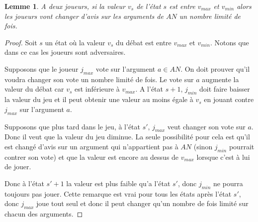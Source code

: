 \documentclass[12pt]{article}
\newtheorem{lemme}{Lemme}[section]
\theoremstyle{defi}
\theoremstyle{not}
\theoremstyle{prob}
\begin{document}
      \begin{lemme}
        \label{lem:question_5}
        A deux joueurs, si la valeur $v_s$ de l'état $s$ est entre $v_{max}$ et $v_{min}$ alors les joueurs vont changer d'avis sur les arguments de $AN$ un nombre limité de fois.
      \end{lemme}
      \begin{proof}
        Soit $s$ un état où la valeur $v_s$ du débat est entre $v_{max}$ et $v_{min}$. Notons que dans ce cas les joueurs sont adversaires.

        Supposons que le joueur $j_{max}$ vote sur l'argument $a \in AN$. On doit prouver qu'il voudra changer son vote un nombre limité de fois.
        Le vote sur $a$ augmente la valeur du débat car $v_s$ est inférieure à $v_{max}$. A l'état $s+1$, $j_{min}$ doit faire baisser la valeur du jeu et il peut obtenir une valeur au moins égale à $v_s$ en jouant contre $j_{max}$ sur l'argument $a$.

        Supposons que plus tard dans le jeu, à l'état $s'$, $j_{max}$ veut changer son vote sur $a$. Donc il veut que la valeur du jeu diminue. La seule possibilité pour cela est qu'il est changé d'avis sur un argument qui n'appartient pas à $AN$ (sinon $j_{min}$ pourrait contrer son vote) et que la valeur est encore au dessus de $v_{max}$ lorsque c'est à lui de jouer.

        Donc à l'état $s'+1$ la valeur est plus faible qu'a l'état $s'$, donc $j_{min}$ ne pourra toujours pas jouer. Cette remarque est vrai pour tous les états après l'état $s'$, donc $j_{max}$ joue tout seul et donc il peut changer qu'un nombre de fois limité sur chacun des arguments.
      \end{proof}
\end{document}
